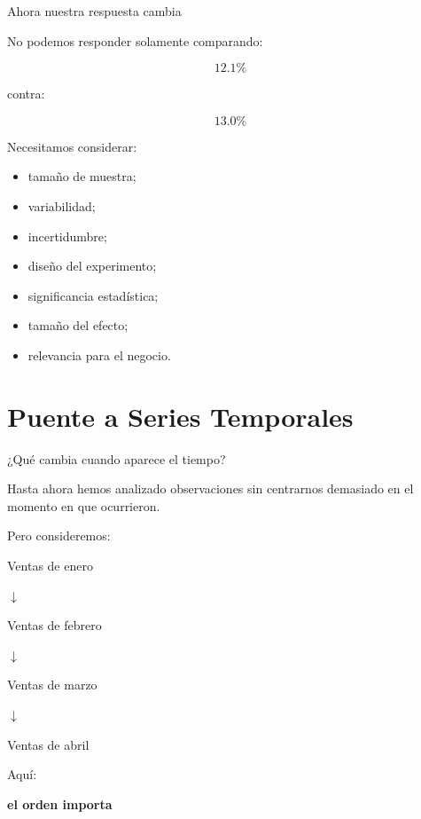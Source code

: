 \documentclass[aspectratio=169,11pt]{beamer}
\begin{document}

\begin{frame}{Ahora nuestra respuesta cambia}

No podemos responder solamente comparando:

\[
12.1\%
\]

contra:

\[
13.0\%
\]

Necesitamos considerar:

\begin{itemize}

    \item tamaño de muestra;

    \item variabilidad;

    \item incertidumbre;

    \item diseño del experimento;

    \item significancia estadística;

    \item tamaño del efecto;

    \item relevancia para el negocio.

\end{itemize}

\end{frame}

\section{Puente a Series Temporales}

\begin{frame}{¿Qué cambia cuando aparece el tiempo?}

Hasta ahora hemos analizado observaciones sin centrarnos demasiado
en el momento en que ocurrieron.

Pero consideremos:

\begin{center}

Ventas de enero

$\downarrow$

Ventas de febrero

$\downarrow$

Ventas de marzo

$\downarrow$

Ventas de abril

\end{center}

\vspace{0.4cm}

Aquí:

\begin{center}

\Large
\textbf{el orden importa}
\end{center}

\end{frame}
\end{document}
